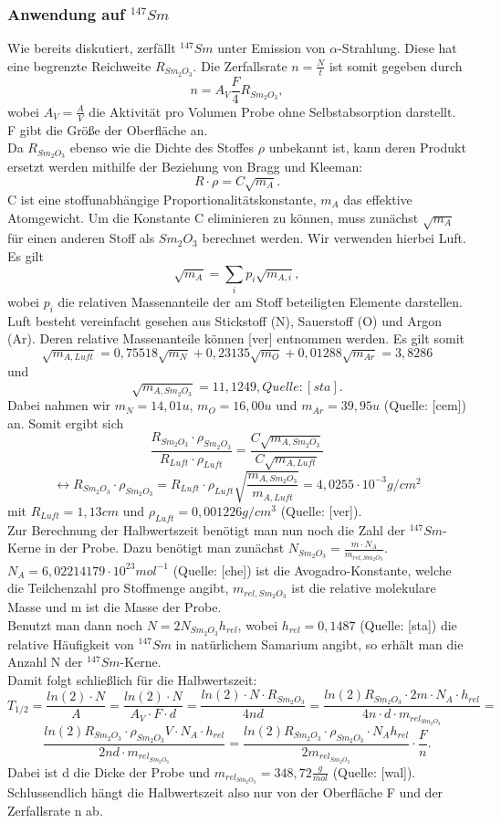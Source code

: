  \subsubsection{Anwendung auf $^{147}Sm$}
 Wie bereits diskutiert, zerfällt $^{147}Sm$ unter Emission von $\alpha$-Strahlung. Diese hat eine begrenzte Reichweite $R_{Sm_{2}O_{3}}$. Die Zerfallsrate $n=\frac{N}{t}$ ist somit gegeben durch \[n=A_{V}\frac{F}{4}R_{Sm_{2}O_{3}},\] wobei $A_{V}=\frac{A}{V}$ die Aktivität pro Volumen Probe ohne Selbstabsorption darstellt. F gibt die Größe der Oberfläche an.\\
  Da $R_{Sm_{2}O_{3}}$ ebenso wie die Dichte des Stoffes $\rho$ unbekannt ist, kann deren Produkt ersetzt werden mithilfe der Beziehung von Bragg und Kleeman: 
  \[R\cdot\rho=C\sqrt{m_{A}}.\] C ist eine stoffunabhängige Proportionalitätskonstante, $m_{A}$ das effektive Atomgewicht. Um die Konstante C eliminieren zu können, muss zunächst $\sqrt{m_{A}}$ für einen anderen Stoff als $Sm_{2}O_{3}$ berechnet werden. Wir verwenden hierbei Luft. Es gilt 
  \[\sqrt{m_{A}}=\sum_{i}p_{i}\sqrt{m_{A,i}},\] wobei $p_{i}$ die relativen Massenanteile der am Stoff beteiligten Elemente darstellen. Luft besteht vereinfacht gesehen aus Stickstoff (N), Sauerstoff (O) und Argon (Ar). Deren relative Massenanteile können [ver] entnommen werden. Es gilt somit 
  \[\sqrt{m_{A,Luft}}=0,75518\sqrt{m_{N}}+0,23135\sqrt{m_{O}}+0,01288\sqrt{m_{Ar}}=3,8286\] und \[\sqrt{m_{A,Sm_{2}O_{3}}}=11,1249, Quelle: [sta].\] Dabei nahmen wir 
  $m_{N}=14,01u$, $m_{O}=16,00u$ und $m_{Ar}=39,95u$ (Quelle: [cem]) an.  Somit ergibt sich \[\frac{R_{Sm_{2}O_{3}}\cdot\rho_{Sm_{2}O_{3}}}{R_{Luft}\cdot\rho_{Luft}}=\frac{C\sqrt{m_{A,Sm_{2}O_{3}}}}{C\sqrt{m_{A,Luft}}}\]
  \[\leftrightarrow R_{Sm_{2}O_{3}}\cdot\rho_{Sm_{2}O_{3}}=R_{Luft}\cdot\rho_{Luft}\sqrt{\frac{m_{A,Sm_{2}O_{3}}}{m_{A,Luft}}}=4,0255\cdot10^{-3}g/cm^{2}\] mit $R_{Luft}=1,13 cm$ und $\rho_{Luft}=0,001226 g/cm^{3}$ (Quelle: [ver]). \\
  Zur Berechnung der Halbwertszeit benötigt man nun noch die Zahl der $^{147}Sm$-Kerne in der Probe. Dazu benötigt man zunächst $N_{Sm_{2}O_{3}}=\frac{m\cdot N_{A}}{m_{rel,Sm_{2}O_{3}}}$. $N_{A}=6,02214179\cdot10^{23}mol^{-1}$ (Quelle: [che]) ist die Avogadro-Konstante, welche die Teilchenzahl pro Stoffmenge angibt, $m_{rel,Sm_{2}O_{3}}$ ist die relative molekulare Masse und m ist die Masse der Probe.\\
  Benutzt man dann noch $N=2N_{Sm_{2}O_{3}}h_{rel}$, wobei $h_{rel}=0,1487$ (Quelle: [sta]) die relative Häufigkeit von $^{147}Sm$ in natürlichem Samarium angibt, so erhält man die Anzahl N der $^{147}Sm$-Kerne.\\
  Damit folgt schließlich für die Halbwertszeit:\[T_{1/2}=\frac{ln(2)\cdot N}{A}=\frac{ln(2)\cdot N}{A_{V}\cdot F\cdot d}=\frac{ln(2)\cdot N\cdot R_{Sm_{2}O_{3}}}{4nd}=\frac{ln(2)R_{Sm_{2}O_{3}}\cdot2m\cdot N_{A}\cdot h_{rel}}{4n\cdot d\cdot m_{rel_{Sm_{2}O_{3}}}}=\]\[\frac{ln(2)R_{Sm_{2}O_{3}}\cdot\rho_{Sm_{2}O_{3}}V\cdot N_{A}\cdot h_{rel}}{2nd\cdot m_{rel_{Sm_{2}O_{3}}}}=\frac{ln(2)R_{Sm_{2}O_{3}}\cdot\rho_{Sm_{2}O_{3}}\cdot N_{A}h_{rel}}{2m_{rel_{Sm_{2}O_{3}}}}\cdot\frac{F}{n}.\] Dabei ist d die Dicke der Probe und $m_{rel_{Sm_{2}O_{3}}}=348,72\frac{g}{mol}$ (Quelle: [wal]). Schlussendlich hängt die Halbwertszeit also nur von der Oberfläche F und der Zerfallsrate n ab.
